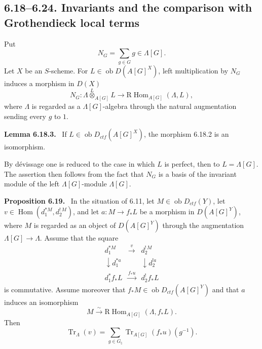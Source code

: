 \documentclass[12pt]{article}
\newcommand{\Hom}{\operatorname{Hom}}
\newcommand{\RHom}{\mathrm R\!\operatorname{Hom}}
\newcommand{\Tr}{\operatorname{Tr}}
\newcommand{\ob}{\operatorname{ob}}
\newenvironment{statement}[1]{\par\medskip\noindent\textbf{#1.}\ }{\par\medskip}
\begin{document}
\subsection*{6.18--6.24. Invariants and the comparison with Grothendieck local terms}

Put
\begin{equation}\tag{6.18.1}
      N_G=\sum_{g\in G}g\in\Lambda[G].
\end{equation}
Let $X$ be an $S$-scheme. For $L\in\ob D(A[G]^X)$, left multiplication by $N_G$
induces a morphism in $D(X)$
\begin{equation}\tag{6.18.2}
      N_G:\Lambda\overset{L}{\otimes}_{A[G]}L
      \longrightarrow \RHom_{A[G]}(\Lambda,L),
\end{equation}
where $\Lambda$ is regarded as a $\Lambda[G]$-algebra through the natural
augmentation sending every $g$ to $1$.

\begin{statement}{Lemma 6.18.3}
If $L\in\ob D_{ctf}(A[G]^X)$, the morphism 6.18.2 is an isomorphism.
\end{statement}

By dévissage one is reduced to the case in which $L$ is perfect, then to
$L=\Lambda[G]$. The assertion then follows from the fact that $N_G$ is a basis of
the invariant module of the left $\Lambda[G]$-module $\Lambda[G]$.

\begin{statement}{Proposition 6.19}
In the situation of 6.11, let $M\in\ob D_{ctf}(Y)$, let
$v\in\Hom(d_1^{*M},d_2^{!\,M})$, and let
$a:M\to f_*L$ be a morphism in $D(A[G]^Y)$, where $M$ is regarded as an object of
$D(A[G]^Y)$ through the augmentation $\Lambda[G]\to\Lambda$. Assume that the square
\[
\begin{array}{ccc}
d_1^{*M} & \xrightarrow{v} & d_2^{!\,M} \\[6pt]
\downarrow\scriptstyle d_1^{*a} & & \downarrow\scriptstyle d_2^{!a} \\[6pt]
d_1^{*}f_*L & \xrightarrow{f_*u} & d_2^{!}f_*L
\end{array}
\]
is commutative. Assume moreover that $f_*M\in\ob D_{ctf}(A[G]^Y)$ and that $a$
induces an isomorphism
\[
       M\xrightarrow{\sim}\RHom_{A[G]}(\Lambda,f_*L).
\]
Then
\begin{equation}\tag{6.19.1}
       \Tr_\Lambda(v)=\sum_{g\in G_\natural}\Tr_{A[G]}(f_*u)(g^{-1}).
\end{equation}
\end{statement}
\end{document}
